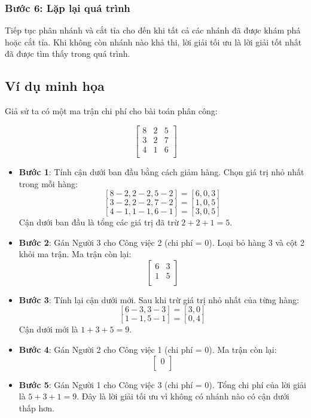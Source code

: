 \subsubsection*{Bước 6: Lặp lại quá trình}
Tiếp tục phân nhánh và cắt tỉa cho đến khi tất cả các nhánh đã được khám phá hoặc cắt tỉa. Khi không còn nhánh nào khả thi, lời giải tối ưu là lời giải tốt nhất đã được tìm thấy trong quá trình.

\subsection{Ví dụ minh họa}

Giả sử ta có một ma trận chi phí cho bài toán phân công:

\[
\begin{bmatrix}
8 & 2 & 5 \\
3 & 2 & 7 \\
4 & 1 & 6 \\
\end{bmatrix}
\]

\begin{itemize}
    \item \textbf{Bước 1}: Tính cận dưới ban đầu bằng cách giảm hàng. Chọn giá trị nhỏ nhất trong mỗi hàng:
    \[
    [8-2, 2-2, 5-2] = [6, 0, 3]
    \]
    \[
    [3-2, 2-2, 7-2] = [1, 0, 5]
    \]
    \[
    [4-1, 1-1, 6-1] = [3, 0, 5]
    \]
    Cận dưới ban đầu là tổng các giá trị đã trừ \(2 + 2 + 1 = 5\).
    
    \item \textbf{Bước 2}: Gán Người 3 cho Công việc 2 (chi phí = 0).
    Loại bỏ hàng 3 và cột 2 khỏi ma trận. Ma trận còn lại:
    \[
    \begin{bmatrix}
    6 & 3 \\
    1 & 5 \\
    \end{bmatrix}
    \]
    
    \item \textbf{Bước 3}: Tính lại cận dưới mới. Sau khi trừ giá trị nhỏ nhất của từng hàng:
    \[
    [6-3, 3-3] = [3, 0]
    \]
    \[
    [1-1, 5-1] = [0, 4]
    \]
    Cận dưới mới là \(1 + 3 + 5 = 9\).
    
    \item \textbf{Bước 4}: Gán Người 2 cho Công việc 1 (chi phí = 0). Ma trận còn lại:
    \[
    \begin{bmatrix}
    0 \\
    \end{bmatrix}
    \]
    
    \item \textbf{Bước 5}: Gán Người 1 cho Công việc 3 (chi phí = 0). Tổng chi phí của lời giải là \(5 + 3 + 1 = 9\). Đây là lời giải tối ưu vì không có nhánh nào có cận dưới thấp hơn.
\end{itemize}

